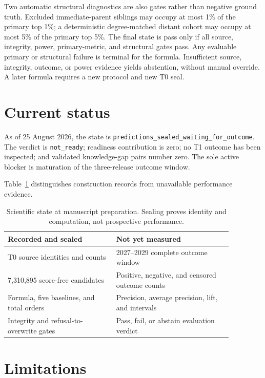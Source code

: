 \documentclass[11pt]{article}
\begin{document}
Two automatic structural diagnostics are also gates rather than negative ground truth. Excluded
immediate-parent siblings may occupy at most 1\% of the primary top 1\%; a deterministic
degree-matched distant cohort may occupy at most 5\% of the primary top 5\%. The final state is pass
only if all source, integrity, power, primary-metric, and structural gates pass. Any evaluable
primary or structural failure is terminal for the formula. Insufficient source, integrity,
outcome, or power evidence yields abstention, without manual override. A later formula requires a
new protocol and new T0 seal.

\section{Current status}

As of 25 August 2026, the state is
\texttt{predictions\_sealed\_waiting\_for\_outcome}. The verdict is \texttt{not\_ready}; readiness
contribution is zero; no T1 outcome has been inspected; and validated knowledge-gap pairs number
zero. The sole active blocker is maturation of the three-release outcome window.

Table~\ref{tab:status} distinguishes construction records from unavailable performance evidence.

\begin{table}[h]
\centering
\begin{tabular}{|p{0.42\linewidth}|p{0.45\linewidth}|}
\hline
Recorded and sealed & Not yet measured \\
\hline
T0 source identities and counts & 2027--2029 complete outcome window \\
7,310,895 score-free candidates & Positive, negative, and censored outcome counts \\
Formula, five baselines, and total orders & Precision, average precision, lift, and intervals \\
Integrity and refusal-to-overwrite gates & Pass, fail, or abstain evaluation verdict \\
\hline
\end{tabular}
\caption{Scientific state at manuscript preparation. Sealing proves identity and computation, not
prospective performance.}
\label{tab:status}
\end{table}

\section{Limitations}
\end{document}
